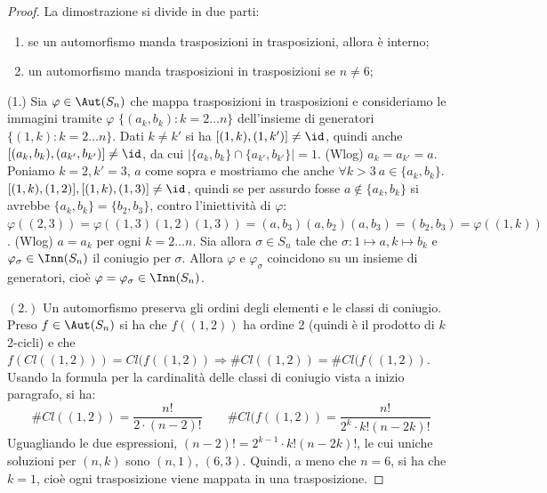 \begin{proof}
    La dimostrazione si divide in due parti: 
    \begin{enumerate}
    \item se un automorfismo manda trasposizioni in trasposizioni, allora è interno;
    \item un automorfismo manda trasposizioni in trasposizioni se $n \neq 6$;
    \end{enumerate}
    (1.) Sia $\varphi \in \Aut(S_n)$ che mappa trasposizioni in trasposizioni e consideriamo le immagini tramite $\varphi$ $\{ (a_k,b_k) : k = 2 \dots n \}$ dell'insieme di generatori $\{ (1,k) : k = 2 \dots n \}$. Dati $k \neq k'$ si ha $[(1, k), (1, k')] \neq \id$, quindi anche $[(a_k,b_k),(a_{k'},b_{k'})] \neq \id$, da cui $\lvert \{a_k,b_k\} \cap \{a_{k'},b_{k'}\} \rvert = 1$. (Wlog) $a_k = a_{k'} = a$. Poniamo $k=2,k'=3$, $a$ come sopra e mostriamo che anche $\forall k > 3 \ a \in \{a_k, b_k\}$. $[(1,k),(1,2)],[(1,k),(1,3)] \neq \id$, quindi se per assurdo fosse $a \notin \{a_k,b_k\}$ si avrebbe $\{a_k,b_k\} = \{b_2,b_3\}$, contro l'iniettività di $\varphi$: $\varphi((2,3)) = \varphi((1,3)(1,2)(1,3)) = (a,b_3)(a,b_2)(a,b_3) = (b_2,b_3) = \varphi((1,k))$. (Wlog) $a = a_k$ per ogni $k = 2\dots n$. Sia allora $\sigma \in S_n$ tale che $\sigma: 1 \mapsto a, k \mapsto b_k$ e $\varphi_\sigma \in \Inn(S_n)$ il coniugio per $\sigma$. Allora $\varphi$ e $\varphi_\sigma$ coincidono su un insieme di generatori, cioè $\varphi = \varphi_\sigma \in \Inn(S_n)$.
    
    $(2.)$ Un automorfismo preserva gli ordini degli elementi e le classi di coniugio. Preso $f \in \Aut(S_n)$ si ha che $f((1,2))$ ha ordine 2 (quindi è il prodotto di $k$ 2-cicli) e che $f(Cl((1,2))) = Cl(f((1,2)) \Rightarrow \#Cl((1,2)) = \#Cl(f((1,2))$. Usando la formula per la cardinalità delle classi di coniugio vista a inizio paragrafo, si ha:
    \[
    \#Cl((1,2)) = \frac{n!}{2\cdot (n-2)!}
    \qquad
    \#Cl(f((1,2)) = \frac{n!}{2^k\cdot k!(n-2k)!}
    \]
    Uguagliando le due espressioni, $(n-2)! = 2^{k-1}\cdot k!(n-2k)!$, le cui uniche soluzioni per $(n,k)$ sono $(n,1)$, $(6,3)$. Quindi, a meno che $n = 6$, si ha che $k = 1$, cioè ogni trasposizione viene mappata in una trasposizione.
\end{proof}

